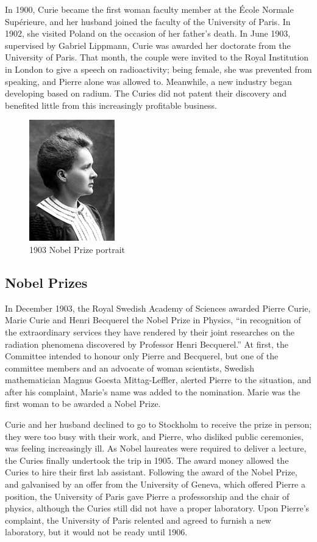 \documentclass[12pt,a4paper]{article}
\begin{document}
In 1900, Curie became the first woman faculty member at the \'Ecole Normale Sup\'erieure, and her husband joined the faculty of the University of Paris. In 1902, she visited Poland on the occasion of her father's death. In June 1903, supervised by Gabriel Lippmann, Curie was awarded her doctorate from the University of Paris. That month, the couple were invited to the Royal Institution in London to give a speech on radioactivity; being female, she was prevented from speaking, and Pierre alone was allowed to. Meanwhile, a new industry began developing based on radium. The Curies did not patent their discovery and benefited little from this increasingly profitable business.

\begin{center}
\begin{figure}[hbpt]
\centerline{\includegraphics{Marie_Curie_1903}}
\caption{1903 Nobel Prize portrait}
\label{nobel_portrait_1903}
\end{figure}
\end{center}

\subsection{Nobel Prizes}

In December 1903, the Royal Swedish Academy of Sciences awarded Pierre Curie, Marie Curie and Henri Becquerel the Nobel Prize in Physics, ``in recognition of the extraordinary services they have rendered by their joint researches on the radiation phenomena discovered by Professor Henri Becquerel.'' At first, the Committee intended to honour only Pierre and Becquerel, but one of the committee members and an advocate of woman scientists, Swedish mathematician Magnus Goesta Mittag-Leffler, alerted Pierre to the situation, and after his complaint, Marie's name was added to the nomination. Marie was the first woman to be awarded a Nobel Prize.

Curie and her husband declined to go to Stockholm to receive the prize in person; they were too busy with their work, and Pierre, who disliked public ceremonies, was feeling increasingly ill. As Nobel laureates were required to deliver a lecture, the Curies finally undertook the trip in 1905. The award money allowed the Curies to hire their first lab assistant. Following the award of the Nobel Prize, and galvanised by an offer from the University of Geneva, which offered Pierre a position, the University of Paris gave Pierre a professorship and the chair of physics, although the Curies still did not have a proper laboratory. Upon Pierre's complaint, the University of Paris relented and agreed to furnish a new laboratory, but it would not be ready until 1906.
\end{document}
